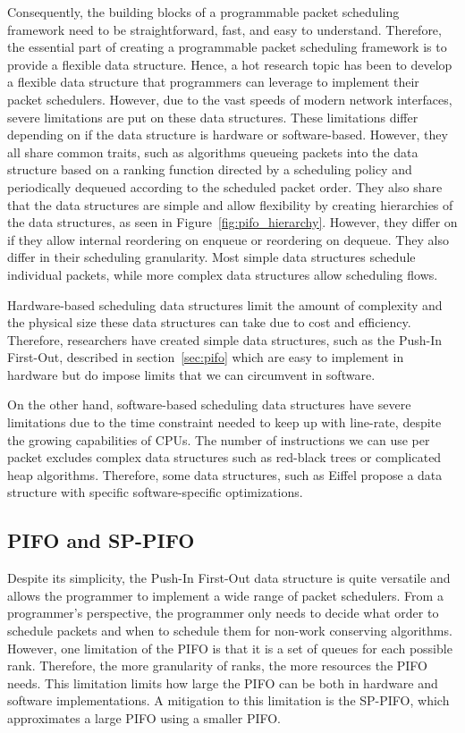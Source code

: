\documentclass[sigconf, nonacm]{acmart}
\begin{document}
Consequently, the building blocks of a programmable packet scheduling framework need to be straightforward, fast, and easy to understand. Therefore, the essential part of creating a programmable packet scheduling framework is to provide a flexible data structure. Hence, a hot research topic has been to develop a flexible data structure that programmers can leverage to implement their packet schedulers. However, due to the vast speeds of modern network interfaces, severe limitations are put on these data structures. These limitations differ depending on if the data structure is hardware or software-based. However, they all share common traits, such as algorithms queueing packets into the data structure based on a ranking function directed by a scheduling policy and periodically dequeued according to the scheduled packet order. They also share that the data structures are simple and allow flexibility by creating hierarchies of the data structures, as seen in Figure~\ref{fig:pifo_hierarchy}. However, they differ on if they allow internal reordering on enqueue or reordering on dequeue. They also differ in their scheduling granularity. Most simple data structures schedule individual packets, while more complex data structures allow scheduling flows.

Hardware-based scheduling data structures limit the amount of complexity and the physical size these data structures can take due to cost and efficiency. Therefore, researchers have created simple data structures, such as the Push-In First-Out, described in section~\ref{sec:pifo} which are easy to implement in hardware but do impose limits that we can circumvent in software.

On the other hand, software-based scheduling data structures have severe limitations due to the time constraint needed to keep up with line-rate, despite the growing capabilities of CPUs. The number of instructions we can use per packet excludes complex data structures such as red-black trees or complicated heap algorithms. Therefore, some data structures, such as Eiffel\cite{Saeed2019} propose a data structure with specific software-specific optimizations.


\subsection{PIFO and SP-PIFO\label{sec:pifo}}

Despite its simplicity, the Push-In First-Out data structure\cite{Sivaraman2016} is quite versatile and allows the programmer to implement a wide range of packet schedulers. From a programmer's perspective, the programmer only needs to decide what order to schedule packets and when to schedule them for non-work conserving algorithms. However, one limitation of the PIFO is that it is a set of queues for each possible rank. Therefore, the more granularity of ranks, the more resources the PIFO needs. This limitation limits how large the PIFO can be both in hardware and software implementations. A mitigation to this limitation is the SP-PIFO\cite{Alcoz2020}, which approximates a large PIFO using a smaller PIFO.
\end{document}
